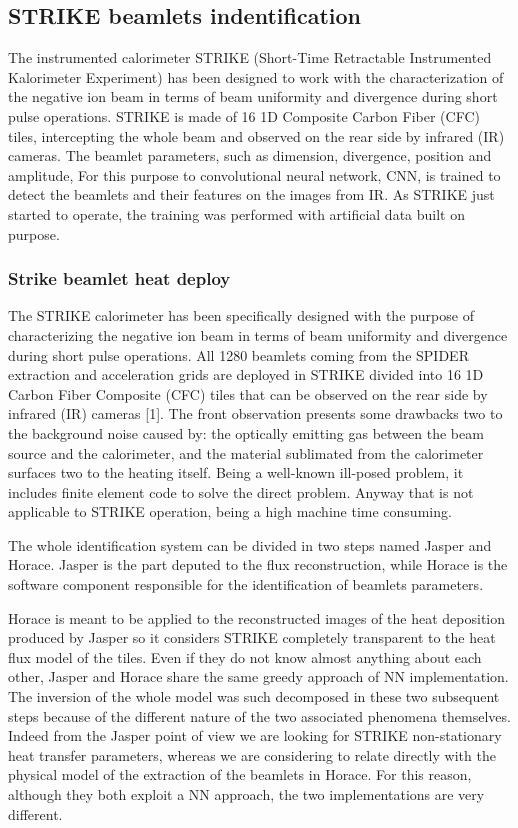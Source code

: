 \subsection{STRIKE beamlets indentification}

The instrumented calorimeter STRIKE (Short-Time Retractable Instrumented Kalorimeter Experiment) has been designed to work with the characterization of the negative ion beam in terms of beam uniformity and divergence during short pulse operations. STRIKE is made of 16 1D Composite Carbon Fiber (CFC) tiles, intercepting the whole beam and observed on the rear side by infrared (IR) cameras.
The beamlet parameters, such as dimension, divergence, position and amplitude, For this purpose to convolutional neural network, CNN, is trained to detect the beamlets and their features on the images from IR. As STRIKE just started to operate, the training was performed with artificial data built on purpose.

\subsubsection{Strike beamlet heat deploy}
The STRIKE calorimeter has been specifically designed with the purpose of characterizing the negative ion beam in terms of beam uniformity and divergence during short pulse operations. All 1280 beamlets coming from the SPIDER extraction and acceleration grids are deployed in STRIKE divided into 16 1D Carbon Fiber Composite (CFC) tiles that can be observed on the rear side by infrared (IR) cameras [1]. The front observation presents some drawbacks two to the background noise caused by: the optically emitting gas between the beam source and the calorimeter, and the material sublimated from the calorimeter surfaces two to the heating itself.
Being a well-known ill-posed problem, it includes finite element code to solve the direct problem. Anyway that is not applicable to STRIKE operation, being a high machine time consuming. 

The whole identification system can be divided in two steps named Jasper and Horace. Jasper is the part deputed to the flux reconstruction, while Horace is the software component responsible for the identification of beamlets parameters.

Horace is meant to be applied to the reconstructed images of the heat deposition produced by Jasper so it considers STRIKE completely transparent to the heat flux model of the tiles. Even if they do not know almost anything about each other, Jasper and Horace share the same greedy approach of NN implementation. 
The inversion of the whole model was such decomposed in these two subsequent steps because of the different nature of the two associated phenomena themselves. Indeed from the Jasper point of view we are looking for STRIKE non-stationary heat transfer parameters, whereas we are considering to relate directly with the physical model of the extraction of the beamlets in Horace. For this reason, although they both exploit a NN approach, the two implementations are very different.

